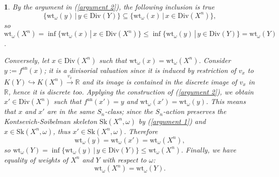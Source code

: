 \documentclass{amsart}%
\numberwithin{equation}{subsection}
\theoremstyle{plain2}
\theoremstyle{definition2}
\theoremstyle{stepstyle}
\theoremstyle{point}
\theoremstyle{subpoint}
\newtheorem{subpoint}[equation]{}%
\newcommand{\spa}[1]{\begin{subpoint}#1\end{subpoint}}           %
\newcommand{\R}{\ensuremath{\mathbb{R}}}
\renewcommand{\R}{\ensuremath{\mathbb{R}}}
\newcommand{\an}{\mathrm{an}}
\newcommand{\weight}{\mathrm{wt}}
\newcommand{\Sk}{\mathrm{Sk}}
\begin{document}
\spa{By the argument in (\ref{argument 2}), the following inclusion is true $$\{ \weight_{\omega}(y) \,|\, y \in \text{Div}(Y)\} \subseteq \{ \weight_{\omega}(x) \,|\, x \in \text{Div}(X^n)\},$$ so $\weight_{\omega}(X^n)= \inf \{\weight_{\omega}(x) \,|\, x \in \text{Div}(X^n)\} \leqslant \inf \{ \weight_{\omega}(y) \,|\, y \in \text{Div}(Y)\}=\weight_{\omega}(Y)$. 

Conversely, let $x \in \text{Div}(X^n)$ such that $\weight_{\omega}(x)=\weight_{\omega}(X^n)$. Consider $y:=f^{\an}(x)$; it is a divisorial valuation since it is induced by restriction of $v_x$ to $K(Y) \hookrightarrow K(X^n) \xrightarrow{v_x} \R$ and its image is contained in the discrete image of $v_x$ in $\R$, hence it is discrete too. Applying the construction of (\ref{argument 2}), we obtain $x' \in \text{Div}(X^n)$ such that $f^{\an}(x')=y$ and $\weight_{\omega}(x')=\weight_{\omega}(y)$. This means that $x$ and $x'$ are in the same $S_n$-class; since the $S_n$-action preserves the Kontsevich-Soibelman skeleton $\Sk(X^n,\omega)$ by (\ref{argument 1}) and $x \in \Sk(X^n, \omega)$, thus $x' \in \Sk(X^n, \omega)$. Therefore $$\weight_{\omega}(y)=\weight_{\omega}(x')=\weight_{\omega}(X^n),$$ so $\weight_{\omega}(Y)= \inf \{\weight_{\omega}(y) \,|\, y \in \text{Div}(Y)\} \leqslant \weight_{\omega}(X^n)$. Finally, we have equality of weights of $X^n$ and $Y$ with respect to $\omega$:\begin{equation} \label{equ equality weight}
\weight_{\omega}(X^n)= \weight_{\omega}(Y).
\end{equation}
}
\end{document}
